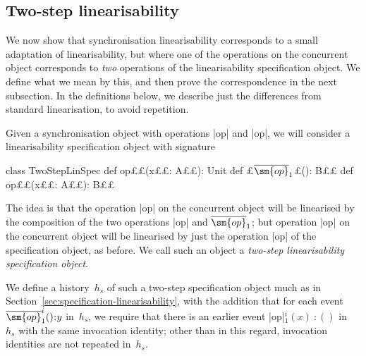 
\subsection{Two-step linearisability}


We now show that synchronisation linearisability corresponds to a small
adaptation of linearisability, but where one of the operations on the
concurrent object corresponds to \emph{two} operations of the linearisability
specification object.  We define what we mean by this, and then prove the
correspondence in the next subsection.  In the definitions below, we describe
just the differences from standard linearisation, to avoid repetition.

Given a synchronisation object with operations |op| and |op|,
we will consider a linearisability specification object with signature
%
\begin{scala}
class TwoStepLinSpec{
  def op££(x££: A££): Unit
  def £$\overline{\sm{op}}_1$£(): B££
  def op££(x££: A££): B££
}
\end{scala}
%
The idea is that the operation |op| on the concurrent object will be
linearised by the composition of the two operations |op| and
$\overline{\sm{op}}_1$; but operation |op| on the concurrent object will be
linearised by just the operation |op| of the specification object, as
before.  We call such an object a \emph{two-step linearisability specification
  object}. 

We define a history~$h_s$ of such a two-step specification object much as in
Section~\ref{sec:specification-linearisability}, with the addition that for
each event $\overline{\sm{op}}_1^i()\::y$ in~$h_s$, we require that there is
an earlier event |op|$_1^i(x)\::()$ in~$h_s$ with the same invocation
identity; other than in this regard, invocation identities are not repeated
in~$h_s$.


